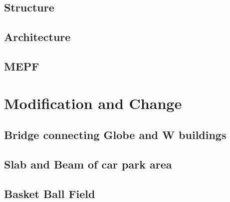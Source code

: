 \documentclass[9pt,twoside,lineno]{pnas-new}
\begin{document}
\subsection{Structure}

\subsection{Architecture}


\subsection{MEPF}

\section{Modification and Change}
\subsection{Bridge connecting Globe and W buildings}

\subsection{Slab and Beam of car park area}

\subsection{Basket Ball Field}







\showacknow %

%
\end{document}
